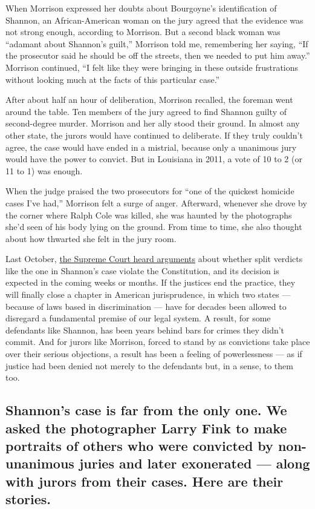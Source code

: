 When Morrison expressed her doubts about Bourgoyne's identification of
Shannon, an African-American woman on the jury agreed that the evidence
was not strong enough, according to Morrison. But a second black woman
was ``adamant about Shannon's guilt,'' Morrison told me, remembering her
saying, ``If the prosecutor said he should be off the streets, then we
needed to put him away.'' Morrison continued, ``I felt like they were
bringing in these outside frustrations without looking much at the facts
of this particular case.''

After about half an hour of deliberation, Morrison recalled, the foreman
went around the table. Ten members of the jury agreed to find Shannon
guilty of second-degree murder. Morrison and her ally stood their
ground. In almost any other state, the jurors would have continued to
deliberate. If they truly couldn't agree, the case would have ended in a
mistrial, because only a unanimous jury would have the power to convict.
But in Louisiana in 2011, a vote of 10 to 2 (or 11 to 1) was enough.

When the judge praised the two prosecutors for ``one of the quickest
homicide cases I've had,'' Morrison felt a surge of anger. Afterward,
whenever she drove by the corner where Ralph Cole was killed, she was
haunted by the photographs she'd seen of his body lying on the ground.
From time to time, she also thought about how thwarted she felt in the
jury room.

Last October,
\href{https://www.supremecourt.gov/oral_arguments/argument_transcripts/2019/18-5924_4gcj.pdf}{the
Supreme Court heard arguments} about whether split verdicts like the one
in Shannon's case violate the Constitution, and its decision is expected
in the coming weeks or months. If the justices end the practice, they
will finally close a chapter in American jurisprudence, in which two
states --- because of laws based in discrimination --- have for decades
been allowed to disregard a fundamental premise of our legal system. A
result, for some defendants like Shannon, has been years behind bars for
crimes they didn't commit. And for jurors like Morrison, forced to stand
by as convictions take place over their serious objections, a result has
been a feeling of powerlessness --- as if justice had been denied not
merely to the defendants but, in a sense, to them too.

\hypertarget{shannons-case-is-far-from-the-only-one-we-asked-the-photographer-larry-fink-to-make-portraits-of-others-who-were-convicted-by-non-unanimous-juries-and-later-exonerated--along-with-jurors-from-their-cases-here-are-their-stories}{%
\subsection{Shannon's case is far from the only one. We asked the
photographer Larry Fink to make portraits of others who were convicted
by non-unanimous juries and later exonerated --- along with jurors from
their cases. Here are their
stories.}\label{shannons-case-is-far-from-the-only-one-we-asked-the-photographer-larry-fink-to-make-portraits-of-others-who-were-convicted-by-non-unanimous-juries-and-later-exonerated--along-with-jurors-from-their-cases-here-are-their-stories}}


